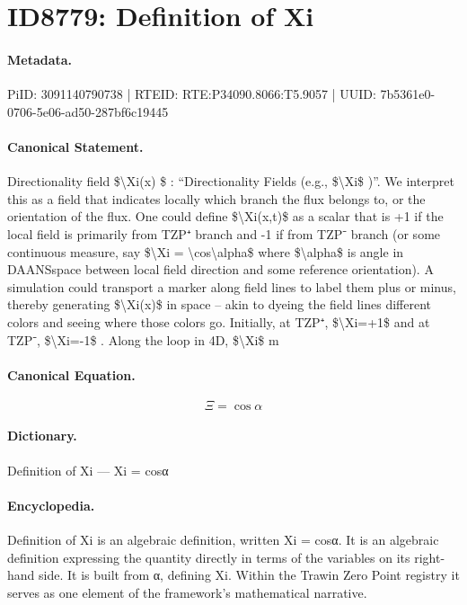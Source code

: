\section*{ID8779: Definition of Xi}
\paragraph{Metadata.}
PiID: 3091140790738 | RTEID: RTE:P34090.8066:T5.9057 | UUID: 7b5361e0-0706-5e06-ad50-287bf6c19445

\paragraph{Canonical Statement.}
Directionality field \$\textbackslash{}Xi(x) \$ : “Directionality Fields (e.g., \$\textbackslash{}Xi\$ )”. We interpret this as a field that indicates locally which branch the flux belongs to, or the orientation of the flux. One could define \$\textbackslash{}Xi(x,t)\$ as a scalar that is +1 if the local field is primarily from TZP⁺ branch and -1 if from TZP⁻ branch (or some continuous measure, say \$\textbackslash{}Xi = \textbackslash{}cos\textbackslash{}alpha\$ where \$\textbackslash{}alpha\$ is angle in DAANSspace between local field direction and some reference orientation). A simulation could transport a marker along field lines to label them plus or minus, thereby generating \$\textbackslash{}Xi(x)\$ in space – akin to dyeing the field lines different colors and seeing where those colors go. Initially, at TZP⁺, \$\textbackslash{}Xi=+1\$ and at TZP⁻, \$\textbackslash{}Xi=-1\$ . Along the loop in 4D, \$\textbackslash{}Xi\$ m

\paragraph{Canonical Equation.}
\[
\Xi = \cos\alpha
\]

\paragraph{Dictionary.}
Definition of Xi — Xi = cosα

\paragraph{Encyclopedia.}
Definition of Xi is an algebraic definition, written Xi = cosα. It is an algebraic definition expressing the quantity directly in terms of the variables on its right-hand side. It is built from α, defining Xi. Within the Trawin Zero Point registry it serves as one element of the framework's mathematical narrative.
